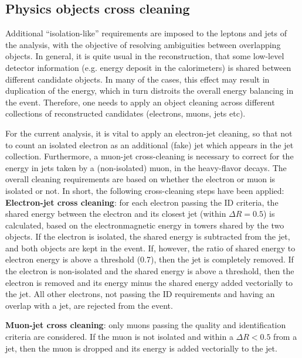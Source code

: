 \subsection{Physics objects cross cleaning}

Additional ``isolation-like'' requirements are imposed to the leptons and jets of the analysis, with the objective of resolving ambiguities between overlapping objects. In general, it is quite usual in the reconstruction, that some low-level detector information (e.g. energy deposit in the calorimeters) is shared between different candidate objects. In many of the cases, this effect may result in duplication of the energy, which in turn distroits the overall energy balancing in the event. Therefore, one needs to apply an object cleaning across different collections of reconstructed candidates (electrons, muons, jets etc). 

For the current analysis, it is vital to apply an electron-jet cleaning, so that not to count an isolated electron as an additional (fake) jet which appears in the jet collection. Furthermore, a muon-jet cross-cleaning is necessary to correct for the energy in jets taken by a (non-isolated) muon, in the heavy-flavor decays. The overall cleaning requirements are based on whether the electron or muon is isolated or not. In short, the following cross-cleaning steps have been applied: \\

\noindent \textbf{Electron-jet cross cleaning}: for each electron passing the ID criteria, the shared energy between the electron and its closest jet (within $\Delta R = 0.5$) is calculated, based on the electronmagnetic energy in towers shared by the two objects. If the electron is isolated, the shared energy is subtracted from the jet, and both objects are kept in the event. If, however, the ratio of shared energy to electron energy is above a threshold (0.7), then the jet is completely removed. If the electron is non-isolated and the shared energy is above a threshold, then the electron is removed and its energy minus the shared energy added vectorially to the jet. All other electrons, not passing the ID requirements and having an overlap with a jet, are rejected from the event.

\noindent \textbf{Muon-jet cross cleaning}: only muons passing the quality and identification criteria are considered. If the muon is not isolated and within a $\Delta R < 0.5$ from a jet, then the muon is dropped and its energy is added vectorially to the jet.

